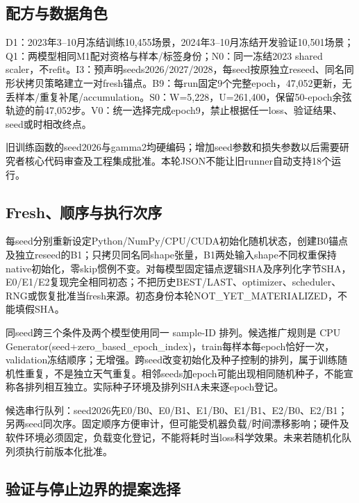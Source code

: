 \documentclass[UTF8,fontset=fandol,10pt]{ctexart}
\begin{document}
\subsection{配方与数据角色}

D1：2023年3–10月冻结训练10,455场景，2024年3–10月冻结开发验证10,501场景；Q1：两模型相同M1配对资格与样本/\allowbreak{}标签身份；N0：同一冻结2023 shared scaler，不refit。I3：预声明seeds2026/\allowbreak{}2027/\allowbreak{}2028，每seed按原独立reseed、同名同形状拷贝策略建立一对fresh锚点。B9：每run固定9个完整epoch，47,052更新，无丢样本/\allowbreak{}重复补尾/\allowbreak{}accumulation。S0：W=5,228，U=261,400，保留50-epoch余弦轨迹的前47,052步。V0：统一选择完成epoch9，禁止根据任一loss、验证结果、seed或时相改终点。

旧训练函数的seed2026与gamma2均硬编码；增加seed参数和损失参数以后需要研究者核心代码审查及工程集成批准。本轮JSON不能让旧runner自动支持18个运行。

\subsection{Fresh、顺序与执行次序}

每seed分别重新设定Python/\allowbreak{}NumPy/\allowbreak{}CPU/\allowbreak{}CUDA初始化随机状态，创建B0锚点及独立reseed的B1；只拷贝同名同shape张量，B1两处输入shape不同权重保持native初始化，零skip惯例不变。对每模型固定锚点逻辑SHA及序列化字节SHA，E0/\allowbreak{}E1/\allowbreak{}E2复现完全相同初态；不把历史BEST/\allowbreak{}LAST、optimizer、scheduler、RNG或恢复批准当fresh来源。初态身份本轮NOT\_\allowbreak{}YET\_\allowbreak{}MATERIALIZED，不能填假SHA。

同seed跨三个条件及两个模型使用同一 sample-ID 排列。候选推广规则是 CPU Generator(seed+zero\_\allowbreak{}based\_\allowbreak{}epoch\_\allowbreak{}index)，train每样本每epoch恰好一次，validation冻结顺序；无增强。跨seed改变初始化及种子控制的排列，属于训练随机性重复，不是独立天气重复。相邻seeds加epoch可能出现相同随机种子，不能宣称各排列相互独立。实际种子环境及排列SHA未来逐epoch登记。

候选串行队列：seed2026先E0/\allowbreak{}B0、E0/\allowbreak{}B1、E1/\allowbreak{}B0、E1/\allowbreak{}B1、E2/\allowbreak{}B0、E2/\allowbreak{}B1；另两seed同次序。固定顺序方便审计，但可能受机器负载/\allowbreak{}时间漂移影响；硬件及软件环境必须固定，负载变化登记，不能将耗时当loss科学效果。未来若随机化队列须执行前版本化批准。

\subsection{验证与停止边界的提案选择}
\end{document}
